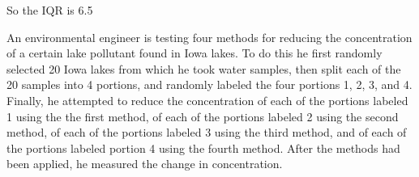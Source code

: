 \documentclass{examsetup}\usepackage[]{graphicx}\usepackage[]{color}
\begin{document}
\begin{questions}
\begin{parts}
\begin{solution}
   So the IQR is 6.5
      
   \end{solution}

\end{parts}

\newpage

\question

An environmental engineer is testing four methods for reducing the concentration of a certain lake pollutant found in Iowa lakes.
To do this he first randomly selected 20 Iowa lakes from which he took water samples,
then split each of the 20 samples into 4 portions, 
and randomly labeled the four portions 1, 2, 3, and 4. 
Finally, he attempted to reduce the concentration of each 
of the portions labeled 1 using the the first method, 
of each of the portions labeled 2 using the second method, 
of each of the portions labeled 3 using the third method, 
and of each of the portions labeled portion 4 using the fourth method. 
After the methods had been applied, he measured the change in concentration. \\

\end{questions}
\end{document}
